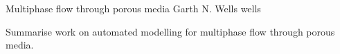               {Multiphase flow through porous media}
              {Garth N. Wells}
              {wells}

Summarise work on automated modelling for multiphase flow through
porous media.

